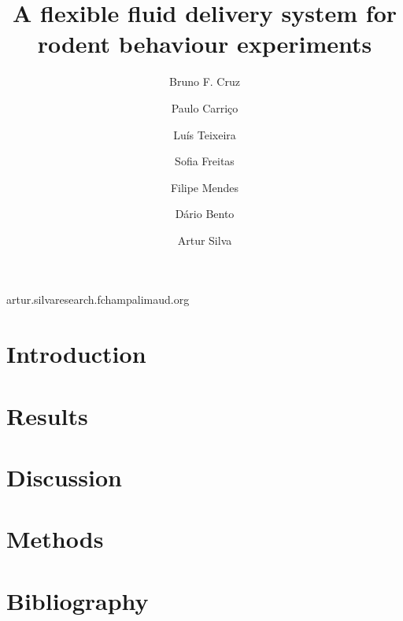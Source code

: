 
\title{A flexible fluid delivery system for rodent behaviour experiments}
\shorttitle{}

\author[1,2,3]{Bruno F. Cruz}
\author[1]{Paulo Carriço}
\author[1]{Luís Teixeira}
\author[1]{Sofia Freitas}
\author[1]{Filipe Mendes}
\author[1]{Dário Bento}
\author[1,\Letter]{Artur Silva}
\date{}

\maketitle

\begin{abstract}


\end{abstract}


\begin{corrauthor}
artur.silva\at research.fchampalimaud.org
\end{corrauthor}

\section*{Introduction}\label{s:introduction}


\section*{Results}\label{s:results}


\section*{Discussion}\label{s:discussion}


\section*{Methods}\label{s:methods}


\section*{Bibliography}



